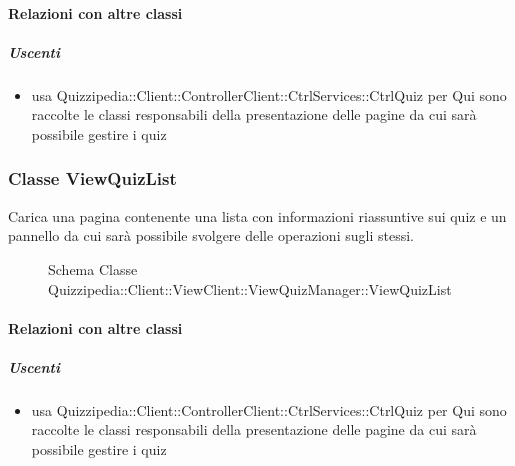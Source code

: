 \paragraph{Relazioni con altre classi}
\subparagraph{Uscenti}
\begin{itemize}
\item usa Quizzipedia::Client::ControllerClient::CtrlServices::CtrlQuiz per Qui sono raccolte le classi responsabili della presentazione delle pagine da cui sarà possibile gestire i quiz
\end{itemize}
\subsubsection{Classe ViewQuizList}
Carica una pagina contenente una lista con informazioni riassuntive sui quiz e un pannello da cui sarà possibile svolgere delle operazioni sugli stessi.
\begin{figure}[H]
\centering
\noindent{}
\caption[Schema Classe ViewQuizList]{Schema Classe Quizzipedia::Client::ViewClient::ViewQuizManager::ViewQuizList}
\end{figure}
\paragraph{Relazioni con altre classi}
\subparagraph{Uscenti}
\begin{itemize}
\item usa Quizzipedia::Client::ControllerClient::CtrlServices::CtrlQuiz per Qui sono raccolte le classi responsabili della presentazione delle pagine da cui sarà possibile gestire i quiz
\end{itemize}
